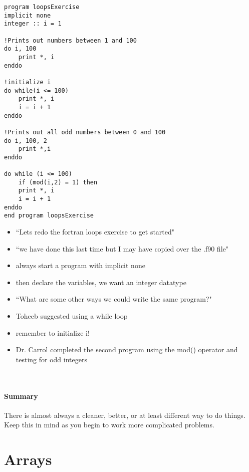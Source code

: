 \documentclass[11pt]{article}
\begin{document}
\noindent
\begin{minipage}[t]{0.45\textwidth}
\begin{lstlisting}
program loopsExercise
implicit none
integer :: i = 1

!Prints out numbers between 1 and 100
do i, 100
	print *, i
enddo

!initialize i
do while(i <= 100)
	print *, i
	i = i + 1
enddo

!Prints out all odd numbers between 0 and 100
do i, 100, 2
	print *,i
enddo

do while (i <= 100)
	if (mod(i,2) = 1) then
	print *, i
	i = i + 1
enddo
end program loopsExercise
\end{lstlisting}
	\end{minipage}
\hfill
\begin{minipage}[t]{0.5\textwidth}
\begin{itemize}
	\item ``Lets redo the fortran loops exercise to get started"
	\item ``we have done this last time but I may have copied over the .f90 file"
	\item always start a program with implicit none
	\item then declare the variables, we want an integer datatype
	\item ``What are some other ways we could write the same program?"
	\item Toheeb suggested using a while loop
	\item remember to initialize i!
	\item Dr. Carrol completed the second program using the mod() operator and testing for odd integers
\end{itemize}
\end{minipage}\\

\paragraph{Summary} There is almost always a cleaner, better, or at least different way to do things. Keep this in mind as you begin to work more complicated problems.

\section{Arrays}
\end{document}
